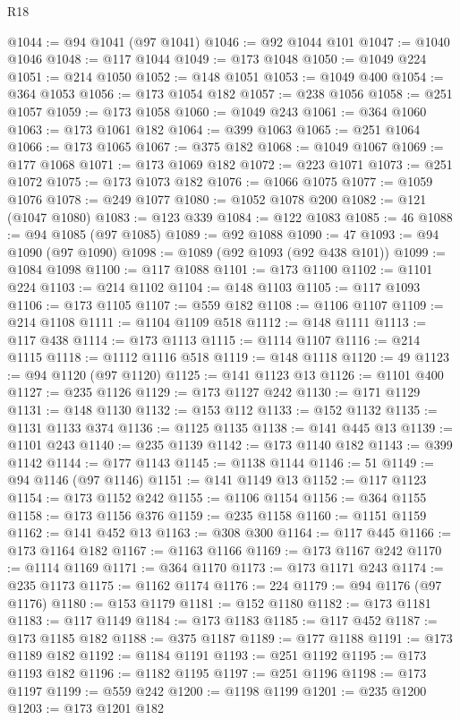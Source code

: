 \begin{lexlean}{R18}
\begin{coremodule}
@1044 := @94 @1041 (@97 @1041)
@1046 := @92 @1044 @101
@1047 := @1040 @1046
@1048 := @117 @1044
@1049 := @173 @1048
@1050 := @1049 @224
@1051 := @214 @1050
@1052 := @148 @1051
@1053 := @1049 @400
@1054 := @364 @1053
@1056 := @173 @1054 @182
@1057 := @238 @1056
@1058 := @251 @1057
@1059 := @173 @1058
@1060 := @1049 @243
@1061 := @364 @1060
@1063 := @173 @1061 @182
@1064 := @399 @1063
@1065 := @251 @1064
@1066 := @173 @1065
@1067 := @375 @182
@1068 := @1049 @1067
@1069 := @177 @1068
@1071 := @173 @1069 @182
@1072 := @223 @1071
@1073 := @251 @1072
@1075 := @173 @1073 @182
@1076 := @1066 @1075
@1077 := @1059 @1076
@1078 := @249 @1077
@1080 := @1052 @1078 @200
@1082 := @121 (@1047 @1080)
@1083 := @123 @339
@1084 := @122 @1083
@1085 := 46
@1088 := @94 @1085 (@97 @1085)
@1089 := @92 @1088
@1090 := 47
@1093 := @94 @1090 (@97 @1090)
@1098 := @1089 (@92 @1093 (@92 @438 @101))
@1099 := @1084 @1098
@1100 := @117 @1088
@1101 := @173 @1100
@1102 := @1101 @224
@1103 := @214 @1102
@1104 := @148 @1103
@1105 := @117 @1093
@1106 := @173 @1105
@1107 := @559 @182
@1108 := @1106 @1107
@1109 := @214 @1108
@1111 := @1104 @1109 @518
@1112 := @148 @1111
@1113 := @117 @438
@1114 := @173 @1113
@1115 := @1114 @1107
@1116 := @214 @1115
@1118 := @1112 @1116 @518
@1119 := @148 @1118
@1120 := 49
@1123 := @94 @1120 (@97 @1120)
@1125 := @141 @1123 @13
@1126 := @1101 @400
@1127 := @235 @1126
@1129 := @173 @1127 @242
@1130 := @171 @1129
@1131 := @148 @1130
@1132 := @153 @112
@1133 := @152 @1132
@1135 := @1131 @1133 @374
@1136 := @1125 @1135
@1138 := @141 @445 @13
@1139 := @1101 @243
@1140 := @235 @1139
@1142 := @173 @1140 @182
@1143 := @399 @1142
@1144 := @177 @1143
@1145 := @1138 @1144
@1146 := 51
@1149 := @94 @1146 (@97 @1146)
@1151 := @141 @1149 @13
@1152 := @117 @1123
@1154 := @173 @1152 @242
@1155 := @1106 @1154
@1156 := @364 @1155
@1158 := @173 @1156 @376
@1159 := @235 @1158
@1160 := @1151 @1159
@1162 := @141 @452 @13
@1163 := @308 @300
@1164 := @117 @445
@1166 := @173 @1164 @182
@1167 := @1163 @1166
@1169 := @173 @1167 @242
@1170 := @1114 @1169
@1171 := @364 @1170
@1173 := @173 @1171 @243
@1174 := @235 @1173
@1175 := @1162 @1174
@1176 := 224
@1179 := @94 @1176 (@97 @1176)
@1180 := @153 @1179
@1181 := @152 @1180
@1182 := @173 @1181
@1183 := @117 @1149
@1184 := @173 @1183
@1185 := @117 @452
@1187 := @173 @1185 @182
@1188 := @375 @1187
@1189 := @177 @1188
@1191 := @173 @1189 @182
@1192 := @1184 @1191
@1193 := @251 @1192
@1195 := @173 @1193 @182
@1196 := @1182 @1195
@1197 := @251 @1196
@1198 := @173 @1197
@1199 := @559 @242
@1200 := @1198 @1199
@1201 := @235 @1200
@1203 := @173 @1201 @182

\end{coremodule}
\end{lexlean}
